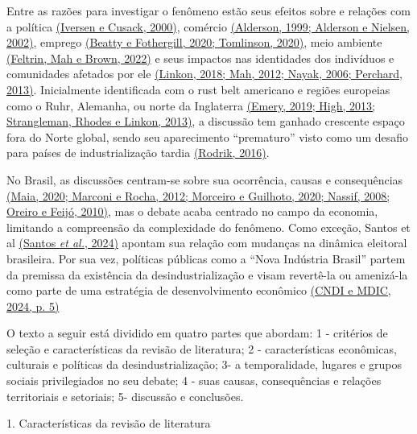 Entre as razões para investigar o fenômeno estão seus efeitos sobre e
relações com a política
\href{https://www.zotero.org/google-docs/?Ah5yEx}{(Iversen e Cusack,
2000)}, comércio
\href{https://www.zotero.org/google-docs/?MxvIWj}{(Alderson, 1999;
Alderson e Nielsen, 2002)}, emprego
\href{https://www.zotero.org/google-docs/?OizqO5}{(Beatty e Fothergill,
2020; Tomlinson, 2020)}, meio ambiente
\href{https://www.zotero.org/google-docs/?FAXcZI}{(Feltrin, Mah e Brown,
2022)} e seus impactos nas identidades dos indivíduos e comunidades
afetados por ele
\href{https://www.zotero.org/google-docs/?AiTsAR}{(Linkon, 2018; Mah,
2012; Nayak, 2006; Perchard, 2013)}. Inicialmente identificada com o
rust belt americano e regiões europeias como o Ruhr, Alemanha, ou norte
da Inglaterra \href{https://www.zotero.org/google-docs/?0FGLrz}{(Emery,
2019; High, 2013; Strangleman, Rhodes e Linkon, 2013)}, a discussão tem
ganhado crescente espaço fora do Norte global, sendo seu aparecimento
``prematuro'' visto como um desafio para países de industrialização
tardia \href{https://www.zotero.org/google-docs/?NLLOOu}{(Rodrik,
2016)}.

No Brasil, as discussões centram-se sobre sua ocorrência, causas e
consequências \href{https://www.zotero.org/google-docs/?YVvSKG}{(Maia,
2020; Marconi e Rocha, 2012; Morceiro e Guilhoto, 2020; Nassif, 2008;
Oreiro e Feijó, 2010)}, mas o debate acaba centrado no campo da
economia, limitando a compreensão da complexidade do fenômeno. Como
exceção, Santos et al
\href{https://www.zotero.org/google-docs/?lvTNTQ}{(Santos \emph{et al.},
2024)} apontam sua relação com mudanças na dinâmica eleitoral
brasileira. Por sua vez, políticas públicas como a ``Nova Indústria
Brasil'' partem da premissa da existência da desindustrialização e visam
revertê-la ou amenizá-la como parte de uma estratégia de desenvolvimento
econômico \href{https://www.zotero.org/google-docs/?PCangB}{(CNDI e
MDIC, 2024, p. 5)}

O texto a seguir está dividido em quatro partes que abordam: 1 -
critérios de seleção e características da revisão de literatura; 2 -
características econômicas, culturais e políticas da
desindustrialização; 3- a temporalidade, lugares e grupos sociais
privilegiados no seu debate; 4 - suas causas, consequências e relações
territoriais e setoriais; 5- discussão e conclusões.

1. Características da revisão de literatura

